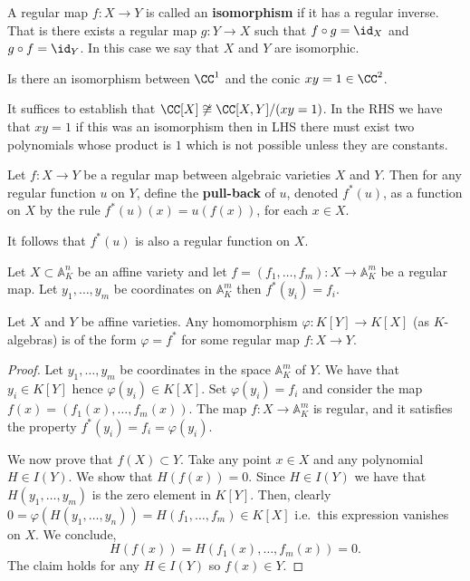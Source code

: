 \documentclass[12pt, a4paper]{article}
\renewcommand{\AA}{\mathbb A}
\begin{document}
\begin{definition}
    A regular map \(f:X\to Y\) is called an \textbf{isomorphism} if it has a regular inverse. That is there exists a regular map \(g:Y \to X\) such that \(f\circ g=\id_X\) and \(g\circ f=\id_Y\). In this case we say that \(X\) and \(Y\) are isomorphic.
\end{definition}

\begin{mdexample}
    Is there an isomorphism between \(\CC^1\) and the conic \(xy=1 \in \CC^2\).
    \begin{solution}
        It suffices to establish that \(\CC[X]\not\cong \CC[X,Y]/(xy=1)\). In the RHS we have that \(xy=1\) if this was an isomorphism then in LHS there must exist two polynomials whose product is \(1\) which is not possible unless they are constants.
    \end{solution}
\end{mdexample}

\begin{definition}
    Let \(f: X \to Y\) be a regular map between algebraic varieties \(X\) and \(Y\). Then for any regular function \(u\) on \(Y\), define the \textbf{pull-back} of \(u\), denoted \(f^*(u)\), as a function on \(X\) by the rule \(f^*(u)(x) = u(f(x))\), for each \(x \in X\). 
    
    It follows that \(f^*(u)\) is also a regular function on \(X\).
\end{definition}

\begin{mdexample}
    Let \(X \subset \AA_K^n\) be an affine variety and let \(f=(f_1,\ldots,f_m) : X \to \AA^m_K\) be a regular map. Let \(y_1,\ldots,y_m\) be coordinates on \(\AA_K^m\) then \(f^*(y_i)=f_i\).
\end{mdexample}

\begin{lemma}
    Let \(X\) and \(Y\) be affine varieties. Any homomorphism \(\varphi:K[Y] \to K[X]\) (as \(K\)-algebras) is of the form \(\varphi=f^*\) for some regular map \(f:X\to Y\).
\end{lemma}

\begin{proof}
    Let \(y_1,\ldots,y_m\) be coordinates in the space \(\AA^m_K\) of \(Y\). We have that \(y_i \in K[Y]\) hence \(\varphi(y_i) \in K[X]\). Set \(\varphi(y_i)=f_i\) and consider the map \(f(x)=(f_1(x),\ldots,f_m(x))\). The map \(f:X \to \AA^m_K\) is regular, and it satisfies the property \(f^*(y_i)=f_i=\varphi(y_i)\). 

    We now prove that \(f(X)\subset Y\). Take any point \(x\in X\) and any polynomial \(H \in I(Y)\). We show that \(H(f(x))=0\). Since \(H \in I(Y)\) we have that \(H(y_1,\ldots,y_m)\) is the zero element in \(K[Y]\). Then, clearly \(0=\varphi(H(y_1,\ldots,y_n))=H(f_1,\ldots,f_m) \in K[X]\) i.e.\ this expression vanishes on \(X\). We conclude, 
    \[H(f(x))=H(f_1(x),\ldots,f_m(x))=0.\]
    The claim holds for any \(H \in I(Y)\) so \(f(x)\in Y\).
\end{proof}
\end{document}
